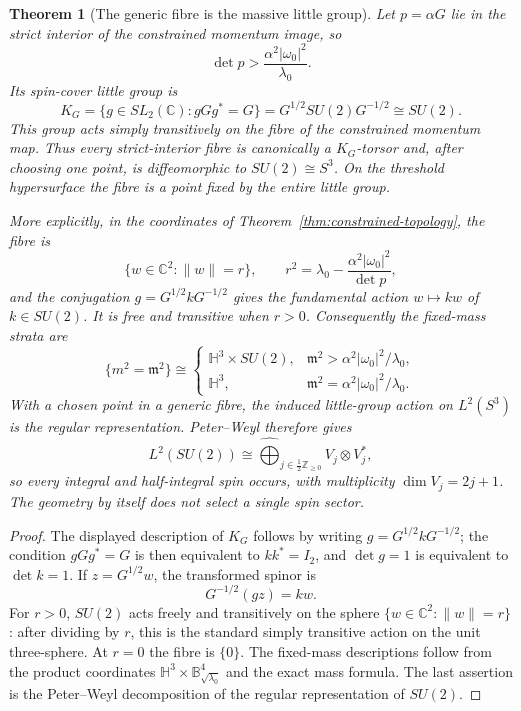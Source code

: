 \documentclass[11pt]{article}
\newtheorem{theorem}{Theorem}[section]
\theoremstyle{definition}
\newcommand{\C}{\mathbb C}
\newcommand{\Z}{\mathbb Z}
\begin{document}
\begin{theorem}[The generic fibre is the massive little group]\label{thm:little-group-fibre}
Let $p=\alpha G$ lie in the strict interior of the constrained momentum image,
so
\[
 \det p>\frac{\alpha^2|\omega_0|^2}{\lambda_0}.
\]
Its spin-cover little group is
\[
 K_G=\{g\in SL_2(\C):gGg^*=G\}
 =G^{1/2}SU(2)G^{-1/2}\cong SU(2).
\]
This group acts simply transitively on the fibre of the constrained momentum
map.  Thus every strict-interior fibre is canonically a $K_G$-torsor and,
after choosing one point, is diffeomorphic to $SU(2)\cong S^3$.  On the
threshold hypersurface the fibre is a point fixed by the entire little group.

More explicitly, in the coordinates of
Theorem~\ref{thm:constrained-topology}, the fibre is
\[
 \{w\in\C^2:\|w\|=r\},
 \qquad
 r^2=\lambda_0-
 \frac{\alpha^2|\omega_0|^2}{\det p},
\]
and the conjugation $g=G^{1/2}kG^{-1/2}$ gives the fundamental action
$w\mapsto kw$ of $k\in SU(2)$.  It is free and transitive when $r>0$.
Consequently the fixed-mass strata are
\[
 \boxed{
 \{m^2=\mathfrak m^2\}\cong
 \begin{cases}
 \mathbb H^3\times SU(2),&
 \mathfrak m^2>\alpha^2|\omega_0|^2/\lambda_0,\\
 \mathbb H^3,&
 \mathfrak m^2=\alpha^2|\omega_0|^2/\lambda_0.
 \end{cases}}
\]
With a chosen point in a generic fibre, the induced little-group action on
$L^2(S^3)$ is the regular representation.  Peter--Weyl therefore gives
\[
 L^2(SU(2))
 \cong
 \widehat\bigoplus_{j\in\frac12\Z_{\geq0}}
 V_j\otimes V_j^*,
\]
so every integral and half-integral spin occurs, with multiplicity
$\dim V_j=2j+1$.  The geometry by itself does not select a single spin sector.
\end{theorem}

\begin{proof}
The displayed description of $K_G$ follows by writing
$g=G^{1/2}kG^{-1/2}$; the condition $gGg^*=G$ is then equivalent to
$kk^*=I_2$, and $\det g=1$ is equivalent to $\det k=1$.  If
$z=G^{1/2}w$, the transformed spinor is
\[
 G^{-1/2}(gz)=kw.
\]
For $r>0$, $SU(2)$ acts freely and transitively on the sphere
$\{w\in\C^2:\|w\|=r\}$: after dividing by $r$, this is the standard simply
transitive action on the unit three-sphere.  At $r=0$ the fibre is $\{0\}$.
The fixed-mass descriptions follow from the product coordinates
$\mathbb H^3\times\mathbb B^4_{\sqrt{\lambda_0}}$ and the exact mass formula.
The last assertion is the Peter--Weyl decomposition of the regular
representation of $SU(2)$.
\end{proof}
\end{document}
